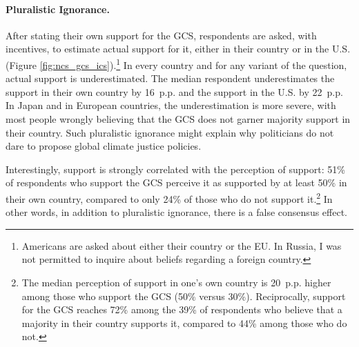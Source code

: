\documentclass[12pt,english]{article}
\begin{document}
\paragraph{Pluralistic Ignorance.} 
After stating their own support for the GCS, respondents are asked, with incentives, to estimate actual support for it, either in their country or in the U.S. (Figure \ref{fig:ncs_gcs_ics}).\footnote{Americans are asked about either their country or the EU. In Russia, I was not permitted to inquire about beliefs regarding a foreign country.} 
In every country and for any variant of the question, actual support is underestimated. The median respondent underestimates the support in their own country by 16~p.p. and the support in the U.S. by 22~p.p. In Japan and in European countries, the underestimation is more severe, with most people wrongly believing that the GCS does not garner majority support in their country. Such pluralistic ignorance might explain why politicians do not dare to propose global climate justice policies. 

Interestingly, support is strongly correlated with the perception of support: 51\% of respondents who support the GCS perceive it as supported by at least 50\% in their own country, compared to only 24\% of those who do not support it.\footnote{The median perception of support in one's own country is 20~p.p. higher among those who support the GCS (50\% versus 30\%). Reciprocally, support for the GCS reaches 72\% among the 39\% of respondents who believe that a majority in their country supports it, compared to 44\% among those who do not.} In other words, in addition to pluralistic ignorance, there is a false consensus effect. 
\end{document}
